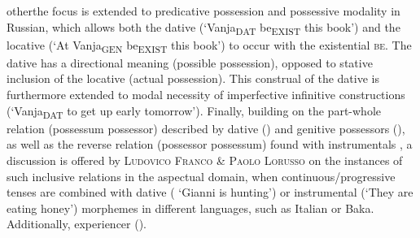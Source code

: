 \begin{styleBodyA}
 otherthe focus is extended to predicative possession and possessive modality in Russian, which allows both the dative (‘Vanja\textsc{\textsubscript{DAT}} be\textsc{\textsubscript{EXIST}} this book’) and the locative (‘At Vanja\textsubscript{GEN} be\textsubscript{EXIST} this book’) to occur with the existential \textsc{be}. The dative has a directional meaning (possible possession), opposed to stative inclusion of the locative (actual possession). This construal of the dative is furthermore extended to modal necessity of imperfective infinitive constructions (‘Vanja\textsubscript{DAT} to get up early tomorrow’).  Finally, building on the part-whole relation (possessum \textstyleNone{${\subseteq}$} possessor) described by dative () and genitive possessors (), as well as the reverse relation (possessor \textstyleNone{${\supseteq}$} possessum) found with instrumentals , a discussion is offered by \textsc{Ludovico} \textsc{Franco} \textsc{\&} \textsc{Paolo} \textsc{Lorusso} on the instances of such inclusive relations in the aspectual domain, when continuous/progressive tenses are combined with dative ( ‘Gianni is hunting’) or instrumental (‘They are eating honey’) morphemes in different languages, such as Italian or Baka. Additionally, experiencer ().
\end{styleBodyA}


